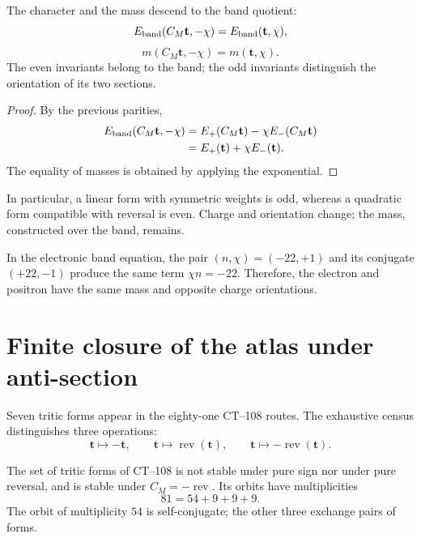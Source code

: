 \begin{theorem}
\label{thm:principio-conjugacion-masa-banda}
The character and the mass descend to the band quotient:
\[
E_{\rm band}(C_M\mathbf t,-\chi)
=E_{\rm band}(\mathbf t,\chi),
\]
\[
\boxed{
m(C_M\mathbf t,-\chi)=m(\mathbf t,\chi).}
\]
The even invariants belong to the band; the odd invariants
distinguish the orientation of its two sections.
\end{theorem}

\begin{proof}
By the previous parities,
\[
\begin{aligned}
E_{\rm band}(C_M\mathbf t,-\chi)
&=E_+(C_M\mathbf t)-\chi E_-(C_M\mathbf t)\\
&=E_+(\mathbf t)+\chi E_-(\mathbf t).
\end{aligned}
\]
The equality of masses is obtained by applying the exponential.
\end{proof}

In particular, a linear form with symmetric weights is odd, whereas a
quadratic form compatible with reversal is even. Charge and
orientation change; the mass, constructed over the band, remains.

\begin{corollary}
\label{cor:electron-positron-banda}
In the electronic band equation, the pair
\((n,\chi)=(-22,+1)\) and its conjugate \((+22,-1)\) produce the same term
\(\chi n=-22\). Therefore, the electron and positron have the same mass and
opposite charge orientations.
\end{corollary}

\section{Finite closure of the atlas under anti-section}

Seven tritic forms appear in the eighty-one CT--108 routes. The exhaustive
census distinguishes three operations:
\[
\mathbf t\longmapsto-\mathbf t,\qquad
\mathbf t\longmapsto\operatorname{rev}(\mathbf t),\qquad
\mathbf t\longmapsto-\operatorname{rev}(\mathbf t).
\]

\begin{proposition}
\label{prop:cierre-antiseccion-ct108}
The set of tritic forms of CT--108 is not stable under pure sign nor
under pure reversal, and is stable under \(C_M=-\operatorname{rev}\). Its
orbits have multiplicities
\[
\boxed{81=54+9+9+9.}
\]
The orbit of multiplicity \(54\) is self-conjugate; the other three
exchange pairs of forms.
\end{proposition}

